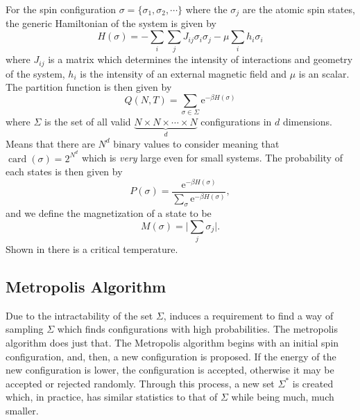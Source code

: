 \documentclass{llncs}
\newcommand{\ee}[1]{\ensuremath{\textrm{e}^{#1}}}
\DeclareMathOperator\card{card}
\begin{document}
For the spin configuration $\sigma=\{\sigma_1,\sigma_2,\cdots\}$ where the $\sigma_j$ are the atomic spin states, the generic Hamiltonian of the system is given by
\begin{equation}
H(\sigma)=-\sum_i\sum_jJ_{ij}\sigma_i\sigma_j-\mu\sum_ih_i\sigma_i
\end{equation}
where $J_{ij}$ is a matrix which determines the intensity of interactions and geometry of the system, $h_i$ is the intensity of an external magnetic field and $\mu$ is an scalar\cite{}. The partition function is then given by 
\begin{equation}
Q(N,T)=\sum_{\sigma\in\Sigma}\ee{-\beta H(\sigma)}
\end{equation}
where $\Sigma$ is the set of all valid $\underbrace{N\times N\times\cdots\times N}_{d}$ configurations in $d$ dimensions. Means that there are $N^d$ binary values to consider meaning that $\card(\sigma)=2^{N^d}$ which is \emph{very} large even for small systems. The probability of each states is then given by 
\begin{equation}
P(\sigma)=\frac{\ee{-\beta H(\sigma)}}{\sum_{\sigma}\ee{-\beta H(\sigma)}},
\end{equation}
and we define the magnetization of a state to be 
\begin{equation} 
M(\sigma)=\Big\vert\sum_j \sigma_j\Big\vert.
\end{equation}
Shown in \cite{} there is a critical temperature. 

\subsection{Metropolis Algorithm}
Due to the intractability of the set $\Sigma$, induces a requirement to find a way of sampling $\Sigma$ which finds configurations with high probabilities. The metropolis algorithm does just that. The Metropolis algorithm begins with an initial spin configuration, and, then, a new configuration is proposed. If the energy of the new configuration is lower, the configuration is accepted, otherwise it may be accepted or rejected randomly. Through this process, a new set $\Sigma^*$ is created which, in practice, has similar statistics to that of $\Sigma$ while being much, much smaller. 
\end{document}
